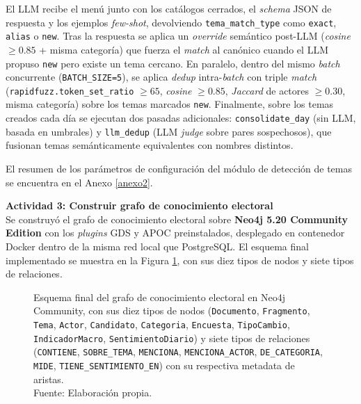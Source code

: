 El LLM recibe el menú junto con los catálogos cerrados, el \textit{schema} JSON de
respuesta y los ejemplos \textit{few-shot}, devolviendo \texttt{tema\_match\_type}
como \texttt{exact}, \texttt{alias} o \texttt{new}. Tras la respuesta se aplica un
\textit{override} semántico post-LLM (\textit{cosine} $\geq 0.85$ + misma
categoría) que fuerza el \textit{match} al canónico cuando el LLM propuso
\texttt{new} pero existe un tema cercano. En paralelo, dentro del mismo
\textit{batch} concurrente (\texttt{BATCH\_SIZE=5}), se aplica \textit{dedup}
intra-\textit{batch} con triple \textit{match} (\texttt{rapidfuzz.token\_set\_ratio}
$\geq 65$, \textit{cosine} $\geq 0.85$, \textit{Jaccard} de actores $\geq 0.30$,
misma categoría) sobre los temas marcados \texttt{new}. Finalmente, sobre los
temas creados cada día se ejecutan dos pasadas adicionales:
\texttt{consolidate\_day} (sin LLM, basada en umbrales) y \texttt{llm\_dedup}
(LLM \textit{judge} sobre pares sospechosos), que fusionan temas semánticamente
equivalentes con nombres distintos.

El resumen de los parámetros de configuración del módulo de detección de temas se
encuentra en el Anexo \ref{anexo2}.

\textbf{Actividad 3: Construir grafo de conocimiento electoral}
\\
Se construyó el grafo de conocimiento electoral sobre \textbf{Neo4j 5.20 Community
Edition} con los \textit{plugins} GDS y APOC preinstalados, desplegado en
contenedor Docker dentro de la misma red local que PostgreSQL. El esquema final
implementado se muestra en la Figura \ref{6:fig3}, con sus diez tipos de nodos y
siete tipos de relaciones.

\begin{figure}[!ht]
    \begin{center}
        \resizebox{0.85\textwidth}{!}{}
        \caption[Esquema final del grafo de conocimiento electoral implementado en Neo4j]{Esquema final del grafo de conocimiento electoral en Neo4j Community, con sus diez tipos de nodos (\texttt{Documento}, \texttt{Fragmento}, \texttt{Tema}, \texttt{Actor}, \texttt{Candidato}, \texttt{Categoria}, \texttt{Encuesta}, \texttt{TipoCambio}, \texttt{IndicadorMacro}, \texttt{SentimientoDiario}) y siete tipos de relaciones (\texttt{CONTIENE}, \texttt{SOBRE\_TEMA}, \texttt{MENCIONA}, \texttt{MENCIONA\_ACTOR}, \texttt{DE\_CATEGORIA}, \texttt{MIDE}, \texttt{TIENE\_SENTIMIENTO\_EN}) con su respectiva metadata de aristas.\\Fuente: Elaboración propia.}
        \label{6:fig3}
    \end{center}
\end{figure}

